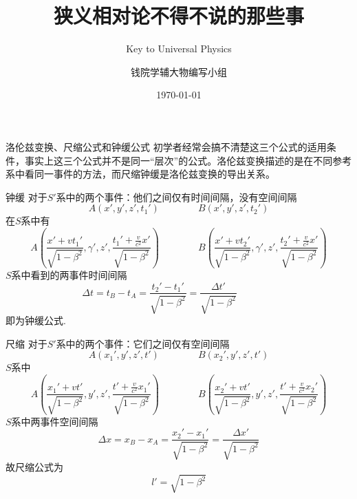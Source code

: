 \documentclass[a4paper, opensource]{./template/qyxf-book}
\title{狭义相对论不得不说的那些事}
\subtitle{Key to Universal Physics}
\author{钱院学辅大物编写小组}
\date{\today}
\begin{document}
\maketitle
\begin{section}{洛伦兹变换、尺缩公式和钟缓公式}
初学者经常会搞不清楚这三个公式的适用条件，事实上这三个公式并不是同一“层次”的公式。洛伦兹变换描述的是在不同参考系中看同一事件的方法，而尺缩钟缓是洛伦兹变换的导出关系。

\begin{subsection}{钟缓}
对于$S'$系中的两个事件：他们之间仅有时间间隔，没有空间间隔
\begin{equation*}
A(x',y',z',t_1') \hspace{4em} B(x',y',z',t_2')
\end{equation*}
在$S$系中有
\begin{equation*}
A(\frac{x'+vt_1'}{\sqrt{1-\beta^2}},\gamma',z',\frac{t_1'+\frac{v}{c^2}x'}{\sqrt{1-\beta^2}}) \hspace{4em} 
B(\frac{x'+vt_2'}{\sqrt{1-\beta^2}},\gamma',z',\frac{t_2'+\frac{v}{c^2}x'}{\sqrt{1-\beta^2}})
\end{equation*}
$S$系中看到的两事件时间间隔
\begin{equation*}
\Delta t = t_B - t_A = \frac{t_2'-t_1'}{\sqrt{1-\beta^2}} = \frac{\Delta t'}{\sqrt{1-\beta^2}} \hspace{4em}
\end{equation*}
即为钟缓公式.
\end{subsection}

\begin{subsection}{尺缩}
对于$S'$系中的两个事件：它们之间仅有空间间隔
\begin{equation*}
A(x_1',y',z',t') \hspace{4em} B(x_2',y',z',t')
\end{equation*}
$S$系中
\begin{equation*}
A(\frac{x_1'+vt'}{\sqrt{1-\beta^2}},y',z',\frac{t'+\frac{v}{c^2}x_1'}{\sqrt{1-\beta^2}}) \hspace{4em}
B(\frac{x_2'+vt'}{\sqrt{1-\beta^2}},y',z',\frac{t'+\frac{v}{c^2}x_2'}{\sqrt{1-\beta^2}})
\end{equation*}
$S$系中两事件空间间隔
\begin{equation*}
\Delta x = x_B - x_A = \frac{x_2'-x_1'}{\sqrt{1-\beta^2}} = \frac{\Delta x'}{\sqrt{1-\beta^2}}
\end{equation*}
故尺缩公式为
\begin{equation*}
l'=\sqrt{1-\beta^2}
\end{equation*}
\end{subsection}


\end{section}
\end{document}
